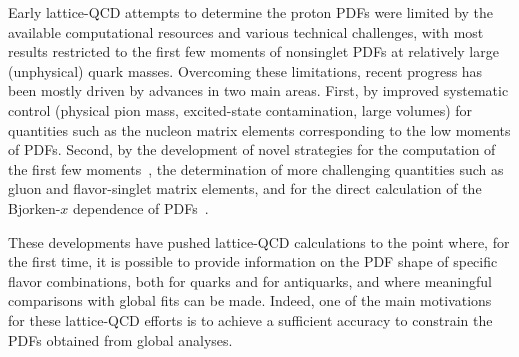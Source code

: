 Early lattice-QCD attempts to determine the proton PDFs were limited by the 
available computational resources and various technical challenges, with most 
results restricted to the first few moments of nonsinglet PDFs at relatively 
large (unphysical) quark masses.
%
Overcoming these limitations, recent progress has been mostly
driven by advances in two main areas. 
%
First, by improved systematic control (physical pion mass, excited-state 
contamination, large volumes) for quantities such as the nucleon matrix 
elements corresponding to the low moments of PDFs.
%
Second, by the  development of novel strategies
for the computation of the first few 
moments~\cite{Constantinou:2014tga,Syritsyn:2014saa,Lin:2012ev},
the determination of more challenging quantities 
such as gluon and flavor-singlet matrix elements, and
for the direct calculation of the 
Bjorken-$x$ dependence of PDFs~\cite{Lin:2014zya,Alexandrou:2015rja,
Chen:2016utp,Alexandrou:2016jqi}.

These developments have pushed lattice-QCD calculations to the point where, 
for the first time, it is possible to provide information on the PDF shape
of specific flavor combinations, both for quarks and for antiquarks, 
and where meaningful comparisons with global fits can be made.
%
Indeed, one of the main motivations for these lattice-QCD efforts is to 
achieve a sufficient accuracy to constrain the PDFs obtained from global 
analyses.

